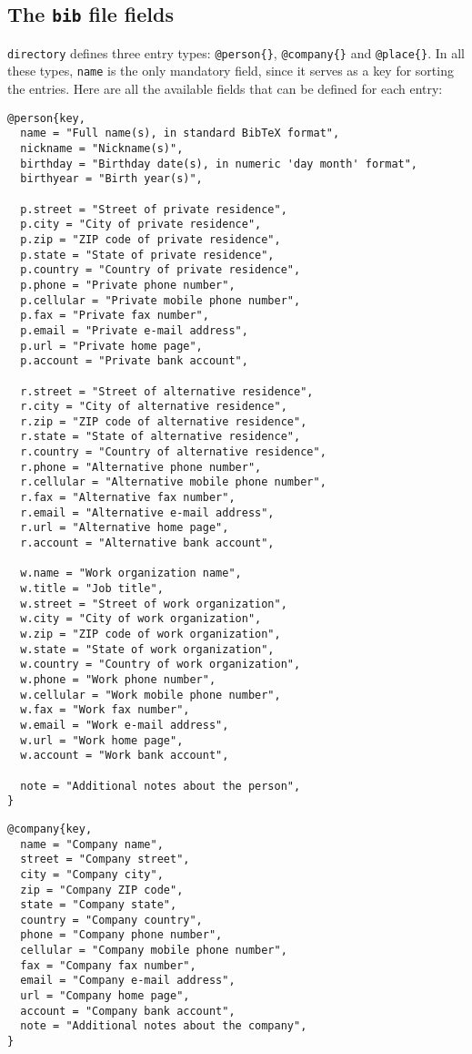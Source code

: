 \documentclass[10pt]{article}
\begin{document}
\subsection{The \texttt{bib} file fields}

\texttt{directory} defines three entry types: \verb'@person{}',
\verb'@company{}' and \verb'@place{}'. In all these types, \texttt{name} is
the only mandatory field, since it serves as a key for sorting the entries.
Here are all the available fields that can be defined for each entry:

\begin{verbatim}
@person{key,
  name = "Full name(s), in standard BibTeX format",
  nickname = "Nickname(s)",
  birthday = "Birthday date(s), in numeric 'day month' format",
  birthyear = "Birth year(s)",

  p.street = "Street of private residence",
  p.city = "City of private residence",
  p.zip = "ZIP code of private residence",
  p.state = "State of private residence",
  p.country = "Country of private residence",
  p.phone = "Private phone number",
  p.cellular = "Private mobile phone number",
  p.fax = "Private fax number",
  p.email = "Private e-mail address",
  p.url = "Private home page",
  p.account = "Private bank account",

  r.street = "Street of alternative residence",
  r.city = "City of alternative residence",
  r.zip = "ZIP code of alternative residence",
  r.state = "State of alternative residence",
  r.country = "Country of alternative residence",
  r.phone = "Alternative phone number",
  r.cellular = "Alternative mobile phone number",
  r.fax = "Alternative fax number",
  r.email = "Alternative e-mail address",
  r.url = "Alternative home page",
  r.account = "Alternative bank account",

  w.name = "Work organization name",
  w.title = "Job title",
  w.street = "Street of work organization",
  w.city = "City of work organization",
  w.zip = "ZIP code of work organization",
  w.state = "State of work organization",
  w.country = "Country of work organization",
  w.phone = "Work phone number",
  w.cellular = "Work mobile phone number",
  w.fax = "Work fax number",
  w.email = "Work e-mail address",
  w.url = "Work home page",
  w.account = "Work bank account",

  note = "Additional notes about the person",
}
\end{verbatim}

\begin{verbatim}
@company{key,
  name = "Company name",
  street = "Company street",
  city = "Company city",
  zip = "Company ZIP code",
  state = "Company state",
  country = "Company country",
  phone = "Company phone number",
  cellular = "Company mobile phone number",
  fax = "Company fax number",
  email = "Company e-mail address",
  url = "Company home page",
  account = "Company bank account",
  note = "Additional notes about the company",
}
\end{verbatim}
\end{document}
